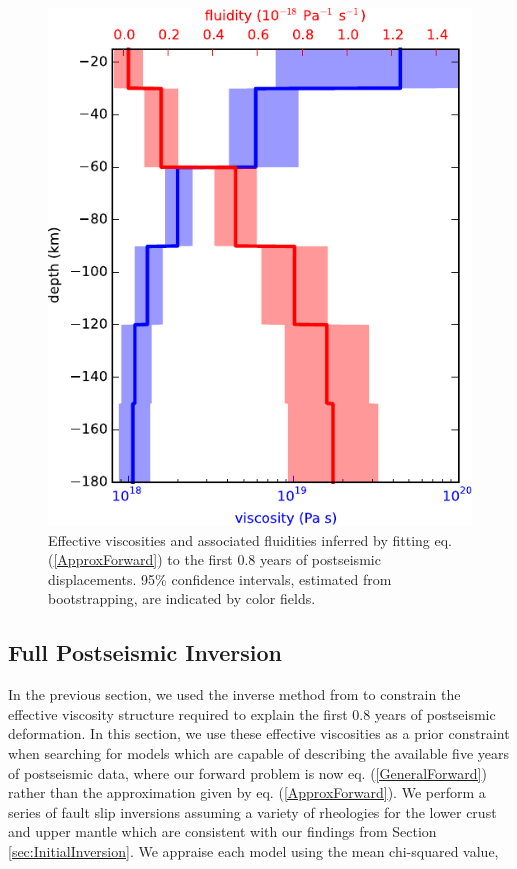 \documentclass[draft,linenumbers]{AGUJournal}
\begin{document}
\begin{figure}
\includegraphics[scale=0.9]{Figures/EffectiveViscosity}
\centering 
\caption{Effective viscosities and associated fluidities inferred by fitting eq. (\ref{ApproxForward}) to the first 0.8 years of postseismic displacements. 95\% confidence intervals, estimated from bootstrapping, are indicated by color fields.}
\label{fig:EffectiveViscosity}
\end{figure} 



\subsection{Full Postseismic Inversion}\label{sec:FullInversion} 

In the previous section, we used the inverse method from \citet{Hines2016} to constrain the effective viscosity structure required to explain the first 0.8 years of postseismic deformation. In this section, we use these effective viscosities as a prior constraint when searching for models which are capable of describing the available five years of postseismic data, where our forward problem is now eq. (\ref{GeneralForward}) rather than the approximation given by eq. (\ref{ApproxForward}).  We perform a series of fault slip inversions assuming a variety of rheologies for the lower crust and upper mantle which are consistent with our findings from Section \ref{sec:InitialInversion}.  We appraise each model using the mean chi-squared value,
\end{document}
